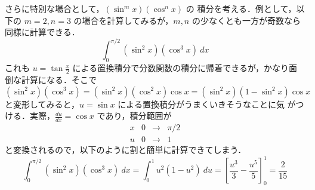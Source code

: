 \documentclass[10pt, uplatex, dvipdfmx]{jsarticle}
\theoremstyle{definition}
\numberwithin{equation}{section}
\newcommand{\ds}{\displaystyle}
\begin{document}
\newpage

さらに特別な場合として，$\left(\sin^m x\right)\left(\cos^nx\right)$ の
積分を考える．例として，以下の $m=2,n=3$ の場合を計算してみるが，$m,n$
の少なくとも一方が奇数なら同様に計算できる．
  \[
    \int_{0}^{\pi/2} \left( \sin^2 x\right) \left( \cos^3 x \right) \ dx
  \]
  これも $\ds u=\tan\frac{x}{2}$ による置換積分で分数関数の積分に帰着できるが，かなり面倒な計算になる．そこで
  \[
    \left( \sin^2 x\right) \left( \cos^3 x\right) = \left( \sin^2 x\right) \left(\cos^2 x\right) \cos x
    = \left( \sin^2 x\right)\left(1-\sin^2 x\right) \cos x
  \]
  と変形してみると，$u=\sin x$ による置換積分がうまくいきそうなことに気
  がつける．実際，$\ds \frac{du}{dx} = \cos x$ であり，積分範囲が
  \[
    \begin{array}{c|ccc}
      x & 0 & \to & \pi/2\\ \hline
      u & 0 & \to & 1
    \end{array}
  \]
  と変換されるので，以下のように割と簡単に計算できてしまう．
  \[
    \int_{0}^{\pi/2} \left( \sin^2 x\right) \left( \cos^3 x\right) \ dx
    = \int_{0}^{1} u^2 \left( 1-u^2\right) \ du = \left[ \frac{u^3}{3} - \frac{u^5}{5}\right]_{0}^{1} = \frac{2}{15}
  \]\\
\end{document}
